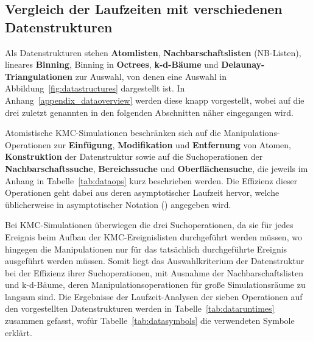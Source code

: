 \subsection{Vergleich der Laufzeiten mit verschiedenen Datenstrukturen}

Als Datenstrukturen stehen \textbf{Atomlisten}, \textbf{Nachbarschaftslisten} (NB-Listen), lineares \textbf{Binning}, Binning in \textbf{Octrees}, \textbf{k-d-Bäume} und \textbf{Delaunay-Triangulationen} zur Auswahl, von denen eine Auswahl in Abbildung~\ref{fig:datastructures} dargestellt ist.
In Anhang~\ref{appendix_dataoverview} werden diese knapp vorgestellt, wobei auf die drei zuletzt genannten in den folgenden Abschnitten näher eingegangen wird.

Atomistische KMC-Simulationen beschränken sich auf die Manipulations-Operationen zur \textbf{Einfügung}, \textbf{Modifikation} und \textbf{Entfernung} von Atomen, \textbf{Konstruktion} der Datenstruktur sowie auf die Suchoperationen der \textbf{Nachbarschaftssuche}, \textbf{Bereichssuche} und \textbf{Oberflächensuche}, die jeweils im Anhang in Tabelle~\ref{tab:dataops} kurz beschrieben werden.
Die Effizienz dieser Operationen geht dabei aus deren asymptotischer Laufzeit hervor, welche üblicherweise in asymptotischer Notation (\BigO{}) angegeben wird.

Bei KMC-Simulationen überwiegen die drei Suchoperationen, da sie für jedes Ereignis beim Aufbau der KMC-Ereignislisten durchgeführt werden müssen, wo hingegen die Manipulationen nur für das tatsächlich durchgeführte Ereignis ausgeführt werden müssen.
Somit liegt das Auswahlkriterium der Datenstruktur bei der Effizienz ihrer Suchoperationen, mit Ausnahme der Nachbarschaftslisten und k-d-Bäume, deren Manipulationsoperationen für große Simulationsräume zu langsam sind.
Die Ergebnisse der Laufzeit-Analysen der sieben Operationen auf den vorgestellten Datenstrukturen werden in Tabelle~\ref{tab:dataruntimes} zusammen gefasst, wofür Tabelle~\ref{tab:datasymbols} die verwendeten Symbole erklärt.

